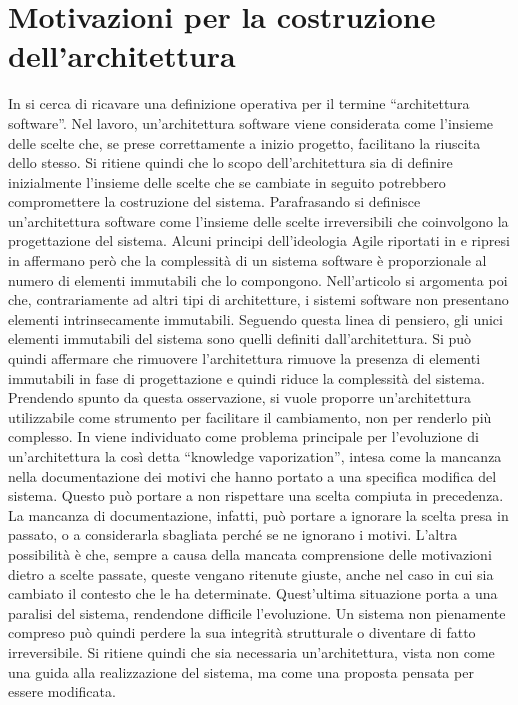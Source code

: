 \documentclass[12pt]{report}
\begin{document}
\section{Motivazioni per la costruzione dell'architettura}
In \cite{whoneedsanArchitect} si cerca di ricavare una definizione operativa per il termine ``architettura software''. 
Nel lavoro, un'architettura software viene considerata come l'insieme delle scelte che, se prese correttamente a inizio progetto, facilitano la riuscita dello stesso.
Si ritiene quindi che lo scopo dell'architettura sia di definire inizialmente l'insieme delle scelte che se cambiate in seguito potrebbero compromettere la costruzione del sistema.
Parafrasando si definisce un'architettura software come l'insieme delle scelte irreversibili che coinvolgono la progettazione del sistema.
Alcuni principi dell'ideologia Agile riportati in \cite{martin_fowler_xp_2002} e ripresi in \cite{whoneedsanArchitect} affermano però che la complessità di un sistema software è proporzionale al numero di elementi immutabili che lo compongono.
Nell'articolo si argomenta poi che, contrariamente ad altri tipi di architetture, i sistemi software non presentano elementi intrinsecamente immutabili. 
Seguendo questa linea di pensiero, gli unici elementi immutabili del sistema sono quelli definiti dall'architettura.
Si può quindi affermare che rimuovere l'architettura rimuove la presenza di elementi immutabili in fase di progettazione e quindi riduce la complessità del sistema.
Prendendo spunto da questa osservazione, si vuole proporre un'architettura utilizzabile come strumento per facilitare il cambiamento, non per renderlo più complesso. 
In \cite{designChoiche} viene individuato come problema principale per l'evoluzione di un'architettura la così detta ``knowledge vaporization'', intesa come la mancanza nella documentazione dei motivi che hanno portato a una specifica modifica del sistema. 
Questo può portare a non rispettare una scelta compiuta in precedenza. 
La mancanza di documentazione, infatti, può portare a ignorare la scelta presa in passato, o a considerarla sbagliata perché se ne ignorano i motivi.  
L'altra possibilità è che, sempre a causa della mancata comprensione delle motivazioni dietro a scelte passate, queste vengano ritenute giuste, anche nel caso in cui sia cambiato il contesto che le ha determinate.
Quest'ultima situazione porta a una paralisi del sistema, rendendone difficile l'evoluzione.
Un sistema non pienamente compreso può quindi perdere la sua integrità strutturale o diventare di fatto irreversibile.
Si ritiene quindi che sia necessaria un'architettura, vista non come una guida alla realizzazione del sistema, ma come una proposta pensata per essere modificata. 
\end{document}

